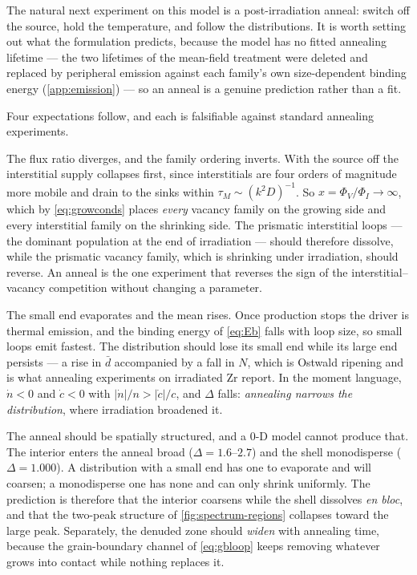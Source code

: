 \label{sec:annealing-outlook}%
The natural next experiment on this model is a post-irradiation anneal: switch
off the source, hold the temperature, and follow the distributions. It is worth
setting out what the formulation predicts, because the model has no
fitted annealing lifetime --- the two lifetimes of the mean-field treatment
were deleted and replaced by peripheral emission against each family's own
size-dependent binding energy (\cref{app:emission}) --- so an anneal is a
genuine prediction rather than a fit.

Four expectations follow, and each is falsifiable against standard annealing
experiments.

The flux ratio diverges, and the family ordering inverts. With the
source off the interstitial supply collapses first, since interstitials are four
orders of magnitude more mobile and drain to the sinks within
$\tau_M\sim(k^{2}D)^{-1}$. So $x=\Phi_V/\Phi_I\to\infty$, which by
\cref{eq:growconds} places \emph{every} vacancy family on the growing side and
every interstitial family on the shrinking side. The prismatic interstitial
loops --- the dominant population at the end of irradiation --- should therefore
dissolve, while the prismatic vacancy family, which is shrinking under
irradiation, should reverse. An anneal is the one experiment that reverses the
sign of the interstitial--vacancy competition without changing a parameter.

The small end evaporates and the mean rises. Once production stops the
driver is thermal emission, and the binding energy of \cref{eq:Eb} falls with
loop size, so small loops emit fastest. The distribution should lose its small
end while its large end persists --- a rise in $\bar d$ accompanied by a fall in
$N$, which is Ostwald ripening and is what annealing experiments on irradiated
Zr report. In the moment language, $\dot n<0$ and $\dot c<0$ with
$|\dot n|/n>|\dot c|/c$, and $\Delta$ falls: \emph{annealing narrows the
distribution}, where irradiation broadened it.

The anneal should be spatially structured, and a $0$-D model cannot
produce that. The interior enters the anneal broad ($\Delta=1.6$--$2.7$) and
the shell monodisperse ($\Delta=1.000$). A distribution with a small end has one
to evaporate and will coarsen; a monodisperse one has none and can only shrink
uniformly. The prediction is therefore that the interior coarsens while the
shell dissolves \emph{en bloc}, and that the two-peak structure of
\cref{fig:spectrum-regions} collapses toward the large peak. Separately, the
denuded zone should \emph{widen} with annealing time, because the
grain-boundary channel of \cref{eq:gbloop} keeps removing whatever grows into
contact while nothing replaces it.

